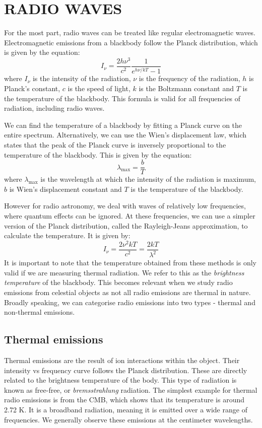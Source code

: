 \documentclass{article_saj}
\begin{document}
\section{RADIO WAVES}
For the most part, radio waves can be treated like regular electromagnetic waves. Electromagnetic emissions from a blackbody follow the Planck distribution, which is given by the equation:
\begin{equation}
  I_{\nu} = \frac{2h\nu^3}{c^2}\frac{1}{e^{h\nu / kT}-1}
\end{equation}
where $I_{\nu}$ is the intensity of the radiation, $\nu$ is the frequency of the radiation, $h$ is Planck's constant, $c$ is the speed of light, $k$ is the Boltzmann constant and $T$ is the temperature of the blackbody. This formula is valid for all frequencies of radiation, including radio waves. 

We can find the temperature of a blackbody by fitting a Planck curve on the entire spectrum. Alternatively, we can use the Wien's displacement law, which states that the peak of the Planck curve is inversely proportional to the temperature of the blackbody. This is given by the equation:
\begin{equation}
  \lambda_{\text{max}} = \frac{b}{T}
\end{equation}
where $\lambda_{\text{max}}$ is the wavelength at which the intensity of the radiation is maximum, $b$ is Wien's displacement constant and $T$ is the temperature of the blackbody.

However for radio astronomy, we deal with waves of relatively low frequencies, where quantum effects can be ignored. At these frequencies, we can use a simpler version of the Planck distribution, called the Rayleigh-Jeans approximation, to calculate the temperature. It is given by:
\begin{equation}
  I_{\nu} = \frac{2\nu^2kT}{c^2} = \frac{2 kT}{\lambda^2}
\end{equation}
It is important to note that the temperature obtained from these methods is only valid if we are measuring thermal radiation. We refer to this as the \textit{brightness temperature} of the blackbody. This becomes relevant when we study radio emissions from celestial objects as not all radio emissions are thermal in nature. Broadly speaking, we can categorise radio emissions into two types - thermal and non-thermal emissions.

\subsection{Thermal emissions}
Thermal emissions are the result of ion interactions within the object. Their intensity vs frequency curve follows the Planck distribution. These are directly related to the brightness temperature of the body. This type of radiation is known as free-free, or \textit {bremsstrahlung} radiation. The simplest example for thermal radio emissions is from the CMB, which shows that its temperature is around 2.72 K. It is a broadband radiation, meaning it is emitted over a wide range of frequencies. We generally observe these emissions at the centimeter wavelengths.
\end{document}

